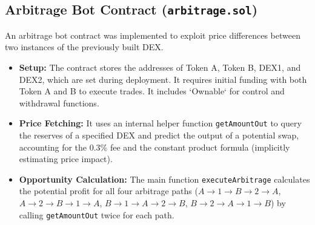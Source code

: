 \documentclass[12pt]{article}
\begin{document}
\subsection{Arbitrage Bot Contract (\texttt{arbitrage.sol})}
An arbitrage bot contract was implemented to exploit price differences between two instances of the previously built DEX.
\begin{itemize}
    \item \textbf{Setup:} The contract stores the addresses of Token A, Token B, DEX1, and DEX2, which are set during deployment. It requires initial funding with both Token A and B to execute trades. It includes `Ownable` for control and withdrawal functions.
    \item \textbf{Price Fetching:} It uses an internal helper function \texttt{getAmountOut} to query the reserves of a specified DEX and predict the output of a potential swap, accounting for the 0.3\% fee and the constant product formula (implicitly estimating price impact).
    \item \textbf{Opportunity Calculation:} The main function \texttt{executeArbitrage} calculates the potential profit for all four arbitrage paths (\(A \rightarrow 1 \rightarrow B \rightarrow 2 \rightarrow A\), \(A \rightarrow 2 \rightarrow B \rightarrow 1 \rightarrow A\), \(B \rightarrow 1 \rightarrow A \rightarrow 2 \rightarrow B\), \(B \rightarrow 2 \rightarrow A \rightarrow 1 \rightarrow B\)) by calling \texttt{getAmountOut} twice for each path.
\end{itemize}
\end{document}
